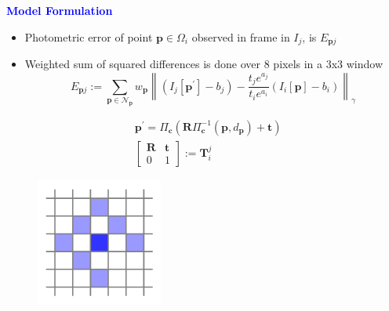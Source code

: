 \documentclass[aspectratio=169]{beamer}
\begin{document}
\begin{frame}{\textcolor{blue}{\textbf{Model Formulation}}}
	\vspace{-0.5cm}
	\begin{itemize}
			\item Photometric error of point $\mathbf{p} \in \Omega_i$ observed in frame in $I_j$, is $E_{\mathbf{p}j}$
			\item Weighted sum of squared differences is done over 8 pixels in a 3x3 window
			\begin{equation}
				E_{\mathbf{p} j}:=\sum_{\mathbf{p} \in \mathcal{N}_{\mathbf{p}}} w_{\mathbf{p}}\left\|\left(I_j\left[\mathbf{p}^{\prime}\right]-b_j\right)-\frac{t_j e^{a_j}}{t_i e^{a_i}}\left(I_i[\mathbf{p}]-b_i\right)\right\|_\gamma
			\end{equation}
	\end{itemize}

	\begin{equation}
		\begin{aligned}
		&\mathbf{p}^{\prime}=\Pi_{\mathbf{c}}\left(\mathbf{R} \Pi_{\mathbf{c}}^{-1}\left(\mathbf{p}, d_{\mathbf{p}}\right)+\mathbf{t}\right)\\
		&\left[\begin{array}{cc}
		\mathbf{R} & \mathbf{t} \\
		0 & 1
		\end{array}\right]:=\mathbf{T}_{i}^{j}
		\end{aligned}
	\end{equation}

	\begin{figure}
		\centering
		\includegraphics[height=0.2\textheight]{pics/residual_pattern.png}
	\end{figure}

\end{frame}
\end{document}
